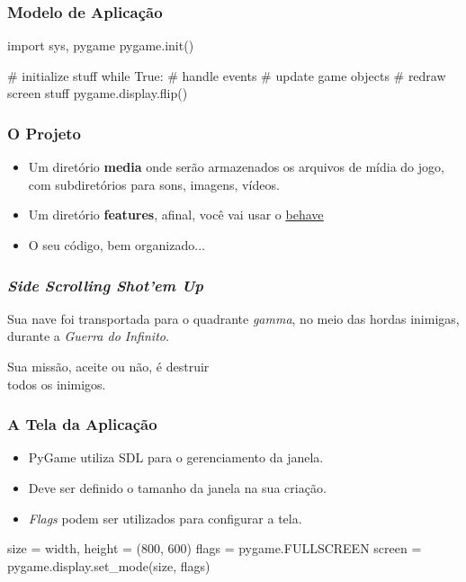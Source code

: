 \begin{frame}[fragile]
    \frametitle{Modelo de Aplicação}

    \begin{python}
        import sys, pygame
        pygame.init()

        # initialize stuff
        while True:
            # handle events
            # update game objects
            # redraw screen stuff
            pygame.display.flip()
    \end{python}
\end{frame}

\begin{frame}
    \frametitle{O Projeto}

    \begin{itemize}
        \item Um diretório \textbf{media} onde serão armazenados os arquivos de
        mídia do jogo, com subdiretórios para sons, imagens, vídeos.
        \item Um diretório \textbf{features}, afinal, você vai usar o
        {\color{blue}\underline{\href{https://github.com/behave}{behave}}}
        \item O seu código, bem organizado...
    \end{itemize}
\end{frame}

\begin{frame}
    \frametitle{\textit{Side Scrolling Shot'em Up}}
    {\large\bfseries
    \begin{center}
        Sua nave foi transportada para o quadrante \textit{gamma}, no meio das hordas
        inimigas, durante a \textit{Guerra do Infinito}.
        \vspace{1cm}

        Sua missão, aceite ou não, é destruir\\todos os inimigos.
    \end{center}
    }
\end{frame}

\begin{frame}[fragile]
    \frametitle{A Tela da Aplicação}

    \begin{itemize}
        \item PyGame utiliza SDL para o gerenciamento da janela.
        \item Deve ser definido o tamanho da janela na sua criação.
        \item \textit{Flags} podem ser utilizados para configurar a tela.
    \end{itemize}

    \begin{python}
        size = width, height = (800, 600)
        flags = pygame.FULLSCREEN
        screen = pygame.display.set_mode(size, flags)
    \end{python}
\end{frame}

